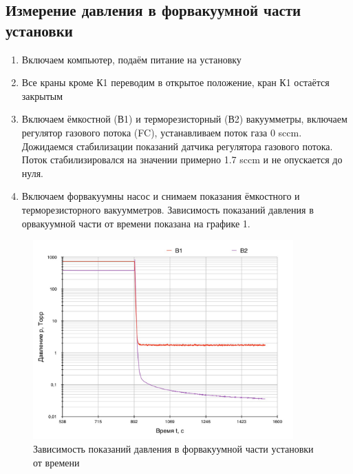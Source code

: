 \documentclass{article}
\begin{document}
\subsection{Измерение давления в форвакуумной части установки}
\begin{enumerate}
    \item Включаем компьютер, подаём питание на установку
    \item Все краны кроме К1 переводим в открытое положение, кран К1 остаётся закрытым
    \item Включаем ёмкостной (В1) и терморезисторный (В2) вакуумметры, включаем регулятор газового потока (FC), устанавливаем поток газа 0 sccm. Дожидаемся стабилизации показаний датчика регулятора газового потока. Поток стабилизировался на значении примерно 1.7 sccm и не опускается до нуля. 
    \item Включаем форвакуумны насос и снимаем показания ёмкостного и терморезисторного вакуумметров. Зависимость показаний давления в орвакуумной части от времени показана на графике 1.
\end{enumerate}

\begin{figure}[h]
    \centering
    \includegraphics[width=10cm]{b1_b2.jpg}
    \caption{Зависимость показаний давления в форвакуумной части установки от времени}
    \label{fig:vac}
\end{figure}
\end{document}

